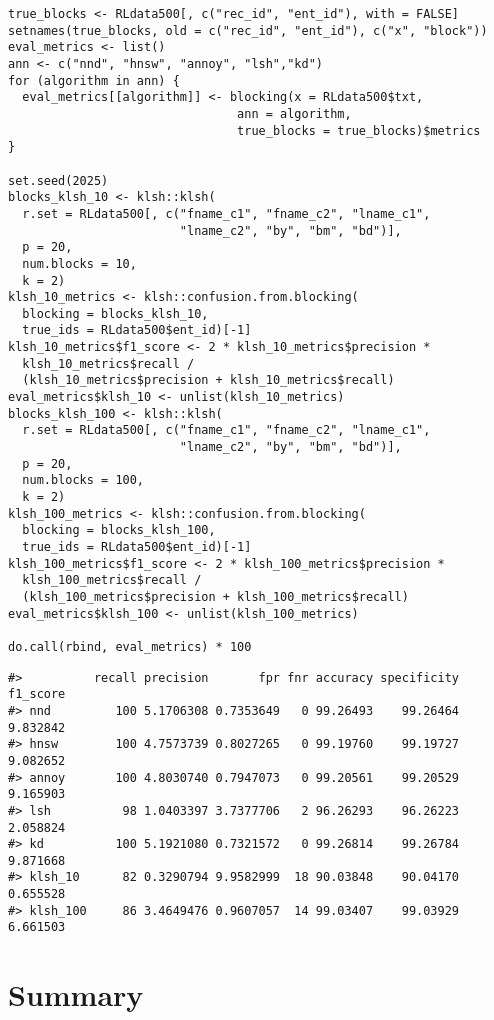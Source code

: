 \begin{verbatim}
true_blocks <- RLdata500[, c("rec_id", "ent_id"), with = FALSE]
setnames(true_blocks, old = c("rec_id", "ent_id"), c("x", "block"))
eval_metrics <- list()
ann <- c("nnd", "hnsw", "annoy", "lsh","kd")
for (algorithm in ann) {
  eval_metrics[[algorithm]] <- blocking(x = RLdata500$txt,
                                ann = algorithm,
                                true_blocks = true_blocks)$metrics
}

set.seed(2025)
blocks_klsh_10 <- klsh::klsh(
  r.set = RLdata500[, c("fname_c1", "fname_c2", "lname_c1",
                        "lname_c2", "by", "bm", "bd")],
  p = 20,
  num.blocks = 10,
  k = 2)
klsh_10_metrics <- klsh::confusion.from.blocking(
  blocking = blocks_klsh_10, 
  true_ids = RLdata500$ent_id)[-1]
klsh_10_metrics$f1_score <- 2 * klsh_10_metrics$precision *
  klsh_10_metrics$recall / 
  (klsh_10_metrics$precision + klsh_10_metrics$recall)
eval_metrics$klsh_10 <- unlist(klsh_10_metrics)
blocks_klsh_100 <- klsh::klsh(
  r.set = RLdata500[, c("fname_c1", "fname_c2", "lname_c1",
                        "lname_c2", "by", "bm", "bd")],
  p = 20,
  num.blocks = 100,
  k = 2)
klsh_100_metrics <- klsh::confusion.from.blocking(
  blocking = blocks_klsh_100, 
  true_ids = RLdata500$ent_id)[-1]
klsh_100_metrics$f1_score <- 2 * klsh_100_metrics$precision * 
  klsh_100_metrics$recall /
  (klsh_100_metrics$precision + klsh_100_metrics$recall)
eval_metrics$klsh_100 <- unlist(klsh_100_metrics)

do.call(rbind, eval_metrics) * 100
\end{verbatim}

\begin{verbatim}
#>          recall precision       fpr fnr accuracy specificity f1_score
#> nnd         100 5.1706308 0.7353649   0 99.26493    99.26464 9.832842
#> hnsw        100 4.7573739 0.8027265   0 99.19760    99.19727 9.082652
#> annoy       100 4.8030740 0.7947073   0 99.20561    99.20529 9.165903
#> lsh          98 1.0403397 3.7377706   2 96.26293    96.26223 2.058824
#> kd          100 5.1921080 0.7321572   0 99.26814    99.26784 9.871668
#> klsh_10      82 0.3290794 9.9582999  18 90.03848    90.04170 0.655528
#> klsh_100     86 3.4649476 0.9607057  14 99.03407    99.03929 6.661503
\end{verbatim}

\section{Summary}\label{summary}

